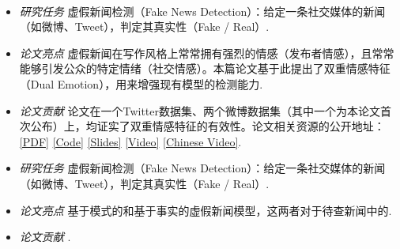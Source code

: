 \documentclass{resume}
\begin{document}
\textbf{\\ \large {}}

{\small {}
}
\small
\begin{itemize}
  \item \textit{研究任务} \quad 虚假新闻检测（Fake News Detection）：给定一条社交媒体的新闻（如微博、Tweet），判定其真实性（Fake / Real）.
  \item \textit{论文亮点} \quad 虚假新闻在写作风格上常常拥有强烈的情感（发布者情感），且常常能够引发公众的特定情绪（社交情感）。本篇论文基于此提出了双重情感特征（Dual Emotion），用来增强现有模型的检测能力.
  \item \textit{论文贡献} \quad 论文在一个Twitter数据集、两个微博数据集（其中一个为本论文首次公布）上，均证实了双重情感特征的有效性。论文相关资源的公开地址：\href{https://www.zhangxueyao.com/data/www2021-dual-emotion-paper.pdf}{[PDF]} \href{https://github.com/RMSnow/WWW2021}{[Code]} \href{https://www.zhangxueyao.com/assets/www2021-dual-emotion-slides.pdf}{[Slides]} \href{https://www.zhangxueyao.com/assets/www2021-dual-emotion-video.mp4}{[Video]} \href{https://www.bilibili.com/video/BV13o4y1m7c3}{[Chinese Video]}.
\end{itemize}

{\small {}
}
\small
\begin{itemize}
  \item \textit{研究任务} \quad 虚假新闻检测（Fake News Detection）：给定一条社交媒体的新闻（如微博、Tweet），判定其真实性（Fake / Real）.
  \item \textit{论文亮点} \quad 基于模式的和基于事实的虚假新闻模型，这两者对于待查新闻中的.
  \item \textit{论文贡献} \quad .
\end{itemize}
\end{document}
